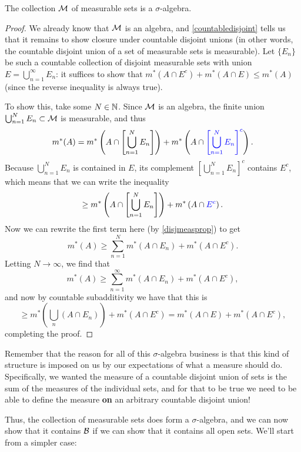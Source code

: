 \begin{theorem}
The collection $\mathcal{M}$ of measurable sets is a $\sigma$-algebra.
\end{theorem}
\begin{proof}
We already know that $\mathcal{M}$ is an algebra, and \cref{countabledisjoint} tells us that it remains to show closure under countable disjoint unions (in other words, the countable disjoint union of a set of measurable sets is measurable). Let $\{E_n\}$ be such a countable collection of disjoint measurable sets with union $E = \bigcup_{n=1}^{\infty} E_n$: it suffices to show that $m^\ast(A \cap E^c) + m^\ast(A \cap E) \le m^\ast(A)$ (since the reverse inequality is always true). 

To show this, take some $N \in \mathbb N$. Since $\mathcal{M}$ is an algebra, the finite union $\bigcup_{n=1}^N E_n \subset \mathcal{M}$ is measurable, and thus
\[
    m^\ast(A) = m^\ast\left(A \cap \left[\bigcup_{n=1}^N E_n\right]\right) + m^\ast\left(A \cap \color{blue}\left[\bigcup_{n=1}^N E_n\right]^c\color{black}\right).
\]
Because $\bigcup_{n=1}^N E_n$ is contained in $E$, its complement $\left[\bigcup_{n=1}^N E_n\right]^c$ contains $E^c$, which means that we can write the inequality
\[
    \ge  m^\ast\left(A \cap \left[\bigcup_{n=1}^N E_n\right]\right) + m^\ast\left(A \cap \color{blue}E^c\color{black}\right).
\]
Now we can rewrite the first term here (by \cref{disjmeasprop}) to get
\[
     m^\ast(A) \ge \sum_{n=1}^N m^\ast(A \cap E_n) + m^\ast(A \cap E^c).
\]
Letting $N \to \infty$, we find that 
\[
    m^\ast(A) \ge \sum_{n=1}^{\infty} m^\ast(A \cap E_n) + m^\ast(A \cap E^c),
\]
and now by countable subadditivity we have that this is
\[
    \ge m^\ast\left(\bigcup_n (A \cap E_n)\right) + m^\ast(A \cap E^c) = m^\ast(A \cap E) + m^\ast(A \cap E^c),
\]
completing the proof.
\end{proof}

\begin{remark}
Remember that the reason for all of this $\sigma$-algebra business is that this kind of structure is imposed on us by our expectations of what a measure should do. Specifically, we wanted the measure of a countable disjoint union of sets is the sum of the measures of the individual sets, and for that to be true we need to be able to define the measure \textbf{on} an arbitrary countable disjoint union!
\end{remark}

Thus, the collection of measurable sets does form a $\sigma$-algebra, and we can now show that it contains $\mathcal{B}$ if we can show that it contains all open sets. We'll start from a simpler case:

